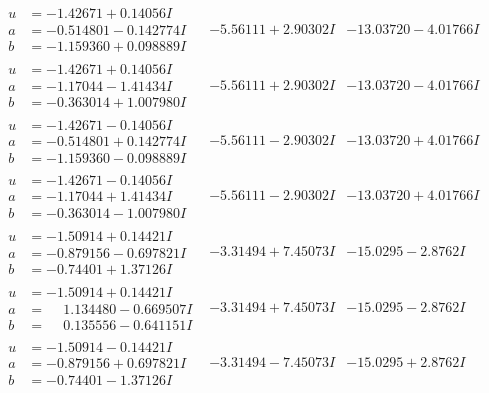 \documentclass[1p]{elsarticle_modified}
\theoremstyle{definition}
\begin{document}
$$\begin{array}{c|c|c}
\begin{aligned}
u &= -1.42671 + 0.14056 I \\
a &= -0.514801 - 0.142774 I \\
b &= -1.159360 + 0.098889 I\end{aligned}
 & -5.56111 + 2.90302 I & -13.03720 - 4.01766 I \\ \hline\begin{aligned}
u &= -1.42671 + 0.14056 I \\
a &= -1.17044 - 1.41434 I \\
b &= -0.363014 + 1.007980 I\end{aligned}
 & -5.56111 + 2.90302 I & -13.03720 - 4.01766 I \\ \hline\begin{aligned}
u &= -1.42671 - 0.14056 I \\
a &= -0.514801 + 0.142774 I \\
b &= -1.159360 - 0.098889 I\end{aligned}
 & -5.56111 - 2.90302 I & -13.03720 + 4.01766 I \\ \hline\begin{aligned}
u &= -1.42671 - 0.14056 I \\
a &= -1.17044 + 1.41434 I \\
b &= -0.363014 - 1.007980 I\end{aligned}
 & -5.56111 - 2.90302 I & -13.03720 + 4.01766 I \\ \hline\begin{aligned}
u &= -1.50914 + 0.14421 I \\
a &= -0.879156 - 0.697821 I \\
b &= -0.74401 + 1.37126 I\end{aligned}
 & -3.31494 + 7.45073 I & -15.0295 - 2.8762 I \\ \hline\begin{aligned}
u &= -1.50914 + 0.14421 I \\
a &= \phantom{-}1.134480 - 0.669507 I \\
b &= \phantom{-}0.135556 - 0.641151 I\end{aligned}
 & -3.31494 + 7.45073 I & -15.0295 - 2.8762 I \\ \hline\begin{aligned}
u &= -1.50914 - 0.14421 I \\
a &= -0.879156 + 0.697821 I \\
b &= -0.74401 - 1.37126 I\end{aligned}
 & -3.31494 - 7.45073 I & -15.0295 + 2.8762 I \\ \hline\begin{aligned}

\end{aligned}
\end{array}$$
\end{document}
